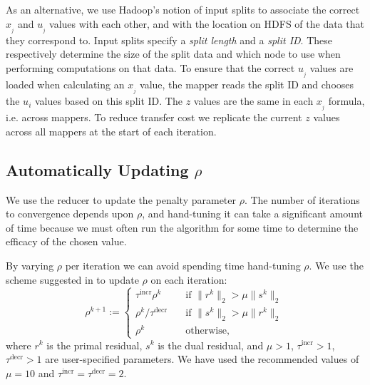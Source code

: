 \documentclass[10pt, conference, compsocconf]{IEEEtran}
\begin{document}
As an alternative, we use Hadoop's notion of input splits to associate the correct $x_{_j}$ and $u_{_j}$ values with each other, and with the location on HDFS of the data that they correspond to.  Input splits specify a \emph{split length} and a \emph{split ID}.  These respectively determine the size of the split data and which node to use when performing computations on that data.  To ensure that the correct $u_{_j}$ values are loaded when calculating an $x_{_j}$ value, the mapper reads the split ID and chooses the $u_i$ values based on this split ID.  The $z$ values are the same in each $x_{_j}$ formula, i.e. across mappers.  To reduce transfer cost we replicate the current $z$ values across all mappers at the start of each iteration.

\subsection{Automatically Updating $\rho$}

We use the reducer to update the penalty parameter $\rho$.  The number of iterations to convergence depends upon $\rho$, and hand-tuning it can take a significant amount of time because we must often run the algorithm for some time to determine the efficacy of the chosen value.

By varying $\rho$ per iteration we can avoid spending time hand-tuning $\rho$.  We use the scheme suggested in \cite{boyd} to update $\rho$ on each iteration:
\begin{equation}
\rho^{k+1}:=\begin{cases}
  \tau^{\text{incr}}\rho^k&\quad \text{if $\|r^k\|_2>\mu\|s^k\|_2$}\\
  \rho^k/\tau^{\text{decr}}&\quad \text{if $\|s^k\|_2>\mu\|r^k\|_2$}\\
  \rho^k&\quad \text{otherwise,}
\end{cases}
\label{eq:r}
\end{equation}
where $r^k$ is the primal residual, $s^k$ is the dual residual, and $\mu>1$, $\tau^{\text{incr}}>1$, $\tau^{\text{decr}}>1$ are user-specified parameters.  We have used the recommended values of $\mu=10$ and $\tau^{\text{incr}}=\tau^{\text{decr}}=2$.
\end{document}
